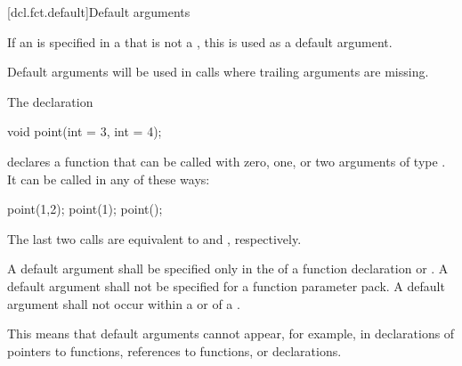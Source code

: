 [dcl.fct.default]{Default arguments}%

\pnum
If an  is specified in a
 that is not a
,
this  is used as a default argument.
\begin{note}
Default arguments will be used in calls
where trailing arguments are missing.
\end{note}

\pnum
{}%
\begin{example}
The declaration
\begin{codeblock}
void point(int = 3, int = 4);
\end{codeblock}
declares a function that can be called with zero, one, or two arguments of type
.
It can be called in any of these ways:
\begin{codeblock}
point(1,2);  point(1);  point();
\end{codeblock}

The last two calls are equivalent to
and
,
respectively.
\end{example}

\pnum
A default argument shall be specified only in the
of a function declaration
or .
A default argument shall not be specified for
a function parameter pack.
A default argument shall not occur within a
or
of a
.
\begin{footnote}
This means that default
arguments cannot appear,
for example, in declarations of pointers to functions,
references to functions, or
declarations.
\end{footnote}

